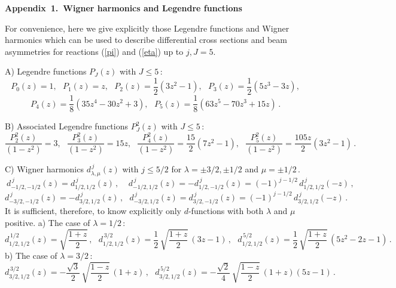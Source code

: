\documentclass[prc,reprint,onecolumn,amsmath,amssymb,superscriptaddress]{revtex4-1}
\begin{document}
\vspace{5mm}
\centerline{\bf Appendix~1.~Wigner harmonics and Legendre functions}
\vspace{2mm}

For convenience, here we give explicitly those Legendre functions
and Wigner harmonics which can be used to describe differential cross
sections and beam asymmetries for reactions (\ref{pi}) and (\ref{eta})
up to $j, J=5$.

A) Legendre functions $P_J(z)$ with $J\leq5\,$:
$$ 
	P_0(z)=1,~~~P_1(z)=z,~~~P_2(z)=\frac{1}{2}(3z^2-1),~~~
	P_3(z)=\frac{1}{2}(5z^3-3z),   
$$
$$ 
	P_4(z)=\frac{1}{8}(35z^4-30z^2+3),~~~
	P_5(z)=\frac{1}{8}(63z^5-70z^3+15z)\,.  
$$

B) Associated Legendre functions $P^2_J(z)$ with $J\leq5\,$:
$$ 
	\frac{P^2_2(z)}{(1-z^2)}=3,~~~\frac{P^2_3(z)}{(1-z^2)}=15z,~~~
	\frac{P^2_4(z)}{(1-z^2)}=\frac{15}2(7z^2-1),~~~
	\frac{P^2_5(z)}{(1-z^2)}=\frac{105z}2(3z^2-1)\,.
$$

C) Wigner harmonics $d^{\,j}_{\lambda,\mu}(z)$ with $j\leq5/2$ for
$\lambda=\pm3/2, \pm1/2$ and $\mu=\pm1/2\,$.\\
$$ 
	~d^{\,j}_{-1/2,-1/2}(z)=d^{\,j}_{1/2,1/2}(z)\,,~~~~~
	d^{\,j}_{-1/2,1/2}(z)=-d^{\,j}_{1/2,-1/2}(z)=(-1)^{j-1/2}\,
	d^{\,j}_{1/2,1/2}(-z)\,,
$$
$$ 
	d^{\,j}_{-3/2,-1/2}(z)=-d^{\,j}_{3/2,1/2}(z)\,,~~~
	d^{\,j}_{-3/2,1/2}(z)=d^{\,j}_{3/2,-1/2}(z)=(-1)^{j-1/2}\,
	d^{\,j}_{3/2,1/2}(-z)\,.
$$
It is sufficient, therefore, to know explicitly only $d$-functions
with both $\lambda$ and $\mu$ positive.
a) The case of $\lambda=1/2\,$:
$$ 
	d^{\,1/2}_{1/2,1/2}(z)=\sqrt{\frac{1+z}2}\,,~~~
	d^{\,3/2}_{1/2,1/2}(z)=\frac12\,\sqrt{\frac{1+z}2}\,(3z-1)\,,~~~
	d^{\,5/2}_{1/2,1/2}(z)=\frac12\,\sqrt{\frac{1+z}2}\,(5z^2-2z-1)\,.
$$
b) The case of $\lambda=3/2\,$:
$$ 
	d^{\,3/2}_{3/2,1/2}(z)=-\frac{\sqrt{3}}2\,\sqrt{\frac{1-z}2}\,(1+z)\,,~~~
	d^{\,5/2}_{3/2,1/2}(z)=-\frac{\sqrt{2}}4\,\sqrt{\frac{1-z}2}\,(1+z)(5z-1)
\,.
$$
\end{document}

